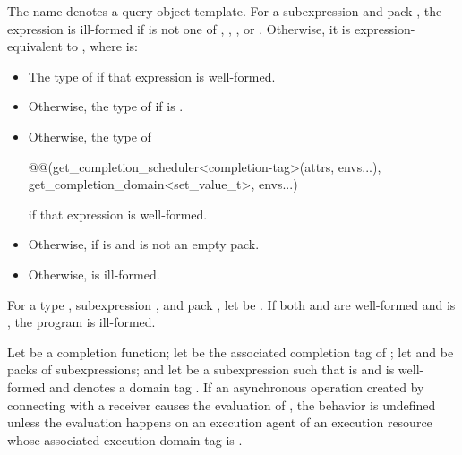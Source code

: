 \pnum
The name  denotes a query object template.
For a subexpression  and pack ,
the expression 
is ill-formed if  is not one of
,
,
, or
.
Otherwise, it is expression-equivalent to
,
where  is:
\begin{itemize}
\item
The type of
if that expression is well-formed.
\item
Otherwise, the type of
if  is .
\item
Otherwise, the type of
\begin{codeblock}
@@(get_completion_scheduler<completion-tag>(attrs, envs...),
          get_completion_domain<set_value_t>, envs...)
\end{codeblock}
if that expression is well-formed.
\item
Otherwise,  if
 is  and
 is not an empty pack.
\item
Otherwise, 
is ill-formed.
\end{itemize}

\pnum
For a type , subexpression , and pack ,
let  be
.
If both  and
 are well-formed and
 is ,
the program is ill-formed.

\pnum
Let  be a completion function;
let  be the associated completion tag of ;
let  and  be packs of subexpressions; and
let  be a subexpression such that
 is  and
is well-formed and denotes a domain tag .
If an asynchronous operation created by connecting
 with a receiver 
causes the evaluation of ,
the behavior is undefined
unless the evaluation happens on an execution agent of an execution resource
whose associated execution domain tag is .

